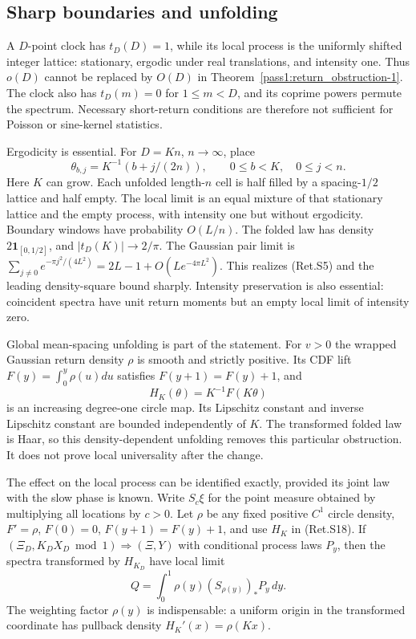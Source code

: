 \hypertarget{sharp-boundaries-and-unfolding}{%
\subsection{Sharp boundaries and unfolding}\label{sharp-boundaries-and-unfolding}}

A \(D\)-point clock has \(t_D(D)=1\), while its local process is the uniformly
shifted integer lattice: stationary, ergodic under real translations, and
intensity one. Thus \(o(D)\) cannot be replaced by \(O(D)\) in Theorem~\ref{pass1:return_obstruction-1}.
The clock also has \(t_D(m)=0\) for \(1\le m<D\), and its coprime powers permute
the spectrum. Necessary short-return conditions are therefore not sufficient
for Poisson or sine-kernel statistics.

Ergodicity is essential. For \(D=Kn\), \(n\to\infty\), place
\[
 \theta_{b,j}=K^{-1}(b+j/(2n)),\qquad
                 0\le b<K,\quad0\le j<n.                        \tag{Ret.S17}
\]
Here \(K\) can grow. Each unfolded length-\(n\) cell is half filled by a
spacing-\(1/2\) lattice and half empty. The local limit is an equal mixture of
that stationary lattice and the empty process, with intensity one but without
ergodicity. Boundary windows have probability \(O(L/n)\). The folded law has
density \(2\mathbf1_{[0,1/2]}\), and \(|t_D(K)|\to2/\pi\).
The Gaussian pair limit is
\(\sum_{j\ne0}e^{-\pi j^2/(4L^2)}=2L-1+O(Le^{-4\pi L^2})\).
This realizes (Ret.S5) and the leading density-square bound sharply.
Intensity preservation is also essential: coincident spectra have unit
return moments but an empty local limit of intensity zero.

Global mean-spacing unfolding is part of the statement. For \(v>0\) the wrapped
Gaussian return density \(\rho\) is smooth and strictly positive. Its CDF lift
\(F(y)=\int_0^y\rho(u)du\) satisfies \(F(y+1)=F(y)+1\), and
\[
                         H_K(\theta)=K^{-1}F(K\theta)            \tag{Ret.S18}
\]
is an increasing degree-one circle map. Its Lipschitz constant and inverse
Lipschitz constant are bounded independently of \(K\). The transformed folded
law is Haar, so this density-dependent unfolding removes this particular
obstruction. It does not prove local universality after the change.

The effect on the local process can be identified exactly, provided its
joint law with the slow phase is known. Write \(S_c\xi\) for the point measure
obtained by multiplying all locations by \(c>0\).
Let \(\rho\) be any fixed positive \(C^1\) circle density, \(F'=\rho\),
\(F(0)=0\), \(F(y+1)=F(y)+1\), and use \(H_K\) in (Ret.S18).
If \((\Xi_D,K_DX_D\bmod1)\Rightarrow(\Xi,Y)\) with conditional process
laws \(P_y\), then the spectra transformed by \(H_{K_D}\) have local limit
\[
              Q=\int_0^1 \rho(y)(S_{\rho(y)})_*P_y\,dy.         \tag{Ret.S25}
\]
The weighting factor \(\rho(y)\) is indispensable: a uniform origin in the
transformed coordinate has pullback density \(H_K'(x)=\rho(Kx)\).

